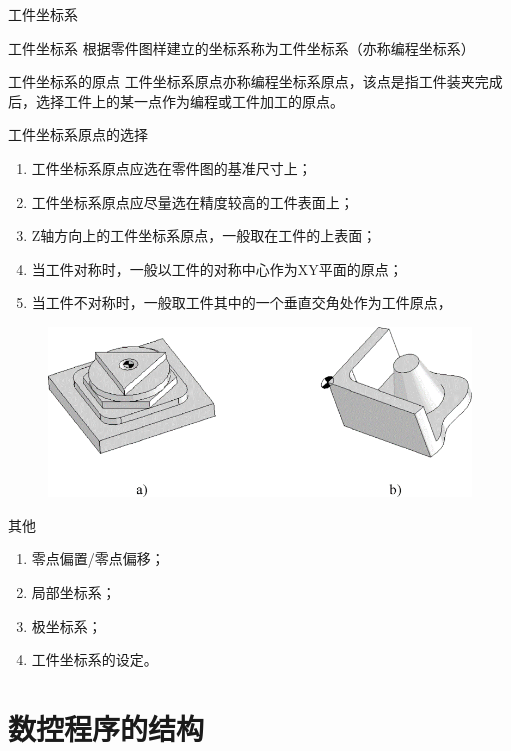 \documentclass[UTF8,zihao=-4]{ctexbeamer}
\begin{document}
\begin{frame}{工件坐标系}
\begin{block}{ 工件坐标系}
	根据零件图样建立的坐标系称为工件坐标系（亦称编程坐标系）
\end{block}

\begin{block}{ 工件坐标系的原点}
	工件坐标系原点亦称编程坐标系原点，该点是指工件装夹完成后，选择工件上的某一点作为编程或工件加工的原点。
\end{block}	
\end{frame}

\begin{frame}{工件坐标系原点的选择 }
\begin{enumerate}
	\item 工件坐标系原点应选在零件图的基准尺寸上；
	\item 工件坐标系原点应尽量选在精度较高的工件表面上；
	\item Z轴方向上的工件坐标系原点，一般取在工件的上表面；
	\item 当工件对称时，一般以工件的对称中心作为XY平面的原点；
	\item 当工件不对称时，一般取工件其中的一个垂直交角处作为工件原点，
\end{enumerate}
\begin{figure}
	\centering
	\includegraphics[width= 0.6\linewidth]{image/2-1}
	\label{fig:1-24}
\end{figure}
\end{frame}

\begin{frame}{其他 }
	\begin{enumerate}
		\item 零点偏置/零点偏移；
		\item 局部坐标系；
		\item 极坐标系；
		\item 工件坐标系的设定。
	\end{enumerate}
\end{frame}


\section{数控程序的结构}
\end{document}
